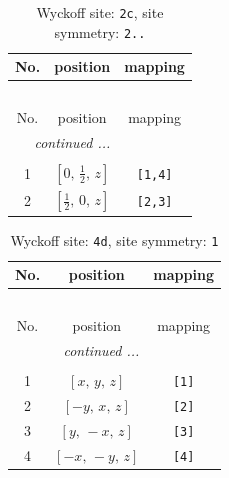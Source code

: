 \documentclass[fleqn,8pt]{jsarticle}
\begin{document}
\begin{longtable}{ccc}
\caption{Wyckoff site: {\tt 2c}, site symmetry: {\tt 2..}}
 \\
 \hline \hline
No. & position & mapping \\ \hline \endfirsthead

\multicolumn{2}{l}{\tablename\ \thetable{}} \\
 \hline \hline
No. & position & mapping \\ \hline \endhead

 \hline \hline
\multicolumn{2}{r}{\footnotesize\it continued ...} \\ \endfoot

 \hline \hline
\multicolumn{2}{r}{} \\ \endlastfoot

1 & $\left[ 0,\, \frac{1}{2},\, z \right]$ & {\tt [1,4]} \\ \hline
2 & $\left[ \frac{1}{2},\, 0,\, z \right]$ & {\tt [2,3]} \\
\end{longtable}
\renewcommand{\arraystretch}{1.2}
\begin{longtable}{ccc}
\caption{Wyckoff site: {\tt 4d}, site symmetry: {\tt 1}}
 \\
 \hline \hline
No. & position & mapping \\ \hline \endfirsthead

\multicolumn{2}{l}{\tablename\ \thetable{}} \\
 \hline \hline
No. & position & mapping \\ \hline \endhead

 \hline \hline
\multicolumn{2}{r}{\footnotesize\it continued ...} \\ \endfoot

 \hline \hline
\multicolumn{2}{r}{} \\ \endlastfoot

1 & $\left[ x,\, y,\, z \right]$ & {\tt [1]} \\ \hline
2 & $\left[ - y,\, x,\, z \right]$ & {\tt [2]} \\ \hline
3 & $\left[ y,\, - x,\, z \right]$ & {\tt [3]} \\ \hline
4 & $\left[ - x,\, - y,\, z \right]$ & {\tt [4]} \\
\end{longtable}
\end{document}

